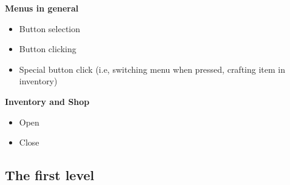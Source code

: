 \documentclass[../Main.tex]{subfiles}
\begin{document}
\textbf{Menus in general}
\begin{itemize}
	\item Button selection
	\item Button clicking
	\item Special button click (i.e, switching menu when pressed, crafting item in inventory)
\end{itemize}


\textbf{Inventory and Shop}
\begin{itemize}
	\item Open
	\item Close
\end{itemize}

\subsection{The first level}
\end{document}
